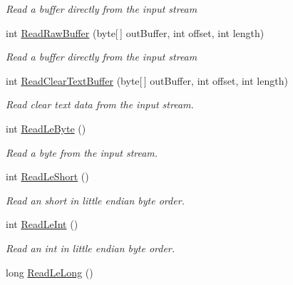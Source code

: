 \begin{DoxyCompactItemize}
\begin{DoxyCompactList}\small\item\em Read a buffer directly from the input stream \end{DoxyCompactList}\item 
int \hyperlink{class_i_c_sharp_code_1_1_sharp_zip_lib_1_1_zip_1_1_compression_1_1_streams_1_1_inflater_input_buffer_ab1d5dd38c12a4aa85b5ab4711d9db38e}{Read\+Raw\+Buffer} (byte\mbox{[}$\,$\mbox{]} out\+Buffer, int offset, int length)
\begin{DoxyCompactList}\small\item\em Read a buffer directly from the input stream \end{DoxyCompactList}\item 
int \hyperlink{class_i_c_sharp_code_1_1_sharp_zip_lib_1_1_zip_1_1_compression_1_1_streams_1_1_inflater_input_buffer_aa41364f1e657de58b5a3ea4bba8a1785}{Read\+Clear\+Text\+Buffer} (byte\mbox{[}$\,$\mbox{]} out\+Buffer, int offset, int length)
\begin{DoxyCompactList}\small\item\em Read clear text data from the input stream. \end{DoxyCompactList}\item 
int \hyperlink{class_i_c_sharp_code_1_1_sharp_zip_lib_1_1_zip_1_1_compression_1_1_streams_1_1_inflater_input_buffer_a654b6527602ee7e40701ff2b6e06f7d1}{Read\+Le\+Byte} ()
\begin{DoxyCompactList}\small\item\em Read a byte from the input stream. \end{DoxyCompactList}\item 
int \hyperlink{class_i_c_sharp_code_1_1_sharp_zip_lib_1_1_zip_1_1_compression_1_1_streams_1_1_inflater_input_buffer_ad32fda3dc02d4bc2b74e86085b56e5fa}{Read\+Le\+Short} ()
\begin{DoxyCompactList}\small\item\em Read an short in little endian byte order. \end{DoxyCompactList}\item 
int \hyperlink{class_i_c_sharp_code_1_1_sharp_zip_lib_1_1_zip_1_1_compression_1_1_streams_1_1_inflater_input_buffer_a1d65153877d19d09c94ca9d410c9fcf3}{Read\+Le\+Int} ()
\begin{DoxyCompactList}\small\item\em Read an int in little endian byte order. \end{DoxyCompactList}\item 
long \hyperlink{class_i_c_sharp_code_1_1_sharp_zip_lib_1_1_zip_1_1_compression_1_1_streams_1_1_inflater_input_buffer_ab992d08820caa0b4330dbef0c66f4df5}{Read\+Le\+Long} ()

\end{DoxyCompactItemize}
